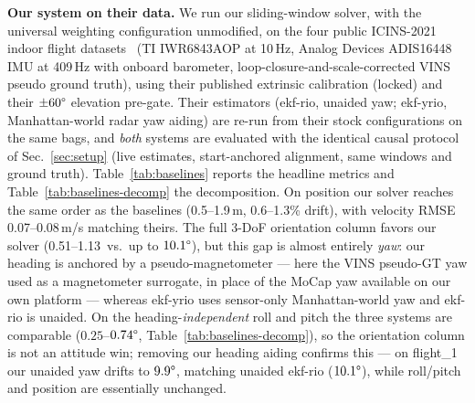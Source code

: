 \documentclass[journal]{IEEEtran}
\begin{document}
\textbf{Our system on their data.}  We run our sliding-window solver,
with the universal weighting configuration unmodified, on the four
public ICINS-2021 indoor flight datasets~\cite{doer2021yrio}
(TI IWR6843AOP at 10\,Hz, Analog Devices ADIS16448 IMU at 409\,Hz with
onboard barometer, loop-closure-and-scale-corrected VINS pseudo ground
truth), using their published extrinsic calibration (locked) and
their $\pm 60\degree$ elevation pre-gate.  Their estimators
(\mbox{ekf-rio}, unaided yaw; \mbox{ekf-yrio}, Manhattan-world radar
yaw aiding) are re-run from their stock configurations on the same
bags, and \emph{both} systems are evaluated with the identical causal
protocol of Sec.~\ref{sec:setup} (live estimates, start-anchored
alignment, same windows and ground truth).
Table~\ref{tab:baselines} reports the headline metrics and
Table~\ref{tab:baselines-decomp} the decomposition.  On position our
solver reaches the same order as the baselines (0.5--1.9\,m,
0.6--1.3\% drift), with velocity RMSE 0.07--0.08\,m/s matching theirs.
The full 3-DoF orientation column favors our solver
(0.51--1.13\degree\ vs.\ up to $10.1\degree$), but this gap is almost
entirely \emph{yaw}: our heading is anchored by a pseudo-magnetometer
--- here the VINS pseudo-GT yaw used as a magnetometer surrogate, in
place of the MoCap yaw available on our own platform --- whereas
ekf-yrio uses sensor-only Manhattan-world yaw and ekf-rio is unaided.
On the heading-\emph{independent} roll and pitch the three systems are
comparable ($0.25$--$0.74\degree$, Table~\ref{tab:baselines-decomp}),
so the orientation column is not an attitude win; removing our heading
aiding confirms this --- on flight\_1 our unaided yaw drifts to
$9.9\degree$, matching unaided ekf-rio ($10.1\degree$), while roll/pitch
and position are essentially unchanged.
\end{document}
